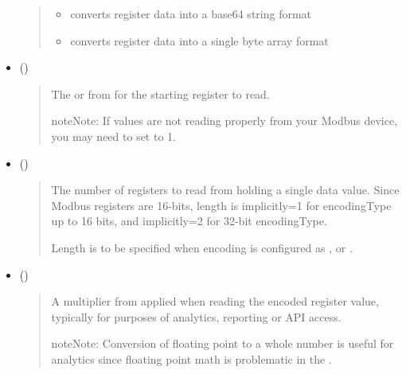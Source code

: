 \documentclass[letterpaper,10pt,english]{sphinxmanual}
\begin{document}
\begin{itemize}
\begin{quote}
\begin{itemize}
\item {} 
 converts register data into a base64 string format

\item {} 
 converts register data into a single byte array format

\end{itemize}
\end{quote}

\item {} 
 ()
\begin{quote}

The  or from  for the starting register to read.

\begin{sphinxadmonition}{note}{Note:}
If values are not reading properly from your Modbus device, you may need to set  to 1.
\end{sphinxadmonition}
\end{quote}

\item {} 
 ()
\begin{quote}

The number of registers to read from  holding a single data value.
Since Modbus registers are 16-bits, length is implicitly=1 for encodingType up to 16 bits, and implicitly=2 for 32-bit encodingType.

Length is  to be specified when encoding is configured as ,  or .
\end{quote}

\item {} 
 ()
\begin{quote}

A multiplier from  applied when reading the encoded register value, typically for purposes of analytics, reporting or API access.

\begin{sphinxadmonition}{note}{Note:}
Conversion of floating point to a whole number is useful for analytics since floating point math is problematic in the .
\end{sphinxadmonition}
\end{quote}

\end{itemize}
\end{document}
